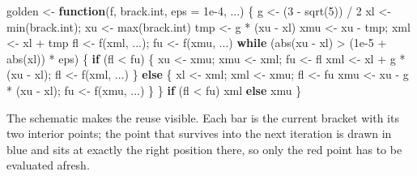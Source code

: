 \documentclass[
  letterpaper,
  DIV=11,
  numbers=noendperiod]{scrreprt}
\newenvironment{Shaded}{\begin{snugshade}}{\end{snugshade}}
\newcommand{\AttributeTok}[1]{\textcolor[rgb]{0.40,0.45,0.13}{#1}}
\newcommand{\ControlFlowTok}[1]{\textcolor[rgb]{0.00,0.23,0.31}{\textbf{#1}}}
\newcommand{\DecValTok}[1]{\textcolor[rgb]{0.68,0.00,0.00}{#1}}
\newcommand{\FloatTok}[1]{\textcolor[rgb]{0.68,0.00,0.00}{#1}}
\newcommand{\FunctionTok}[1]{\textcolor[rgb]{0.28,0.35,0.67}{#1}}
\newcommand{\NormalTok}[1]{\textcolor[rgb]{0.00,0.23,0.31}{#1}}
\newcommand{\OtherTok}[1]{\textcolor[rgb]{0.00,0.23,0.31}{#1}}
\newcommand{\SpecialCharTok}[1]{\textcolor[rgb]{0.37,0.37,0.37}{#1}}
\begin{document}
\begin{Shaded}
\begin{Highlighting}[]
\NormalTok{golden }\OtherTok{\textless{}{-}} \ControlFlowTok{function}\NormalTok{(f, brack.int, }\AttributeTok{eps =} \FloatTok{1e{-}4}\NormalTok{, ...) \{}
\NormalTok{  g }\OtherTok{\textless{}{-}}\NormalTok{ (}\DecValTok{3} \SpecialCharTok{{-}} \FunctionTok{sqrt}\NormalTok{(}\DecValTok{5}\NormalTok{)) }\SpecialCharTok{/} \DecValTok{2}
\NormalTok{  xl }\OtherTok{\textless{}{-}} \FunctionTok{min}\NormalTok{(brack.int); xu }\OtherTok{\textless{}{-}} \FunctionTok{max}\NormalTok{(brack.int)}
\NormalTok{  tmp }\OtherTok{\textless{}{-}}\NormalTok{ g }\SpecialCharTok{*}\NormalTok{ (xu }\SpecialCharTok{{-}}\NormalTok{ xl)}
\NormalTok{  xmu }\OtherTok{\textless{}{-}}\NormalTok{ xu }\SpecialCharTok{{-}}\NormalTok{ tmp; xml }\OtherTok{\textless{}{-}}\NormalTok{ xl }\SpecialCharTok{+}\NormalTok{ tmp}
\NormalTok{  fl }\OtherTok{\textless{}{-}} \FunctionTok{f}\NormalTok{(xml, ...); fu }\OtherTok{\textless{}{-}} \FunctionTok{f}\NormalTok{(xmu, ...)}
  \ControlFlowTok{while}\NormalTok{ (}\FunctionTok{abs}\NormalTok{(xu }\SpecialCharTok{{-}}\NormalTok{ xl) }\SpecialCharTok{\textgreater{}}\NormalTok{ (}\FloatTok{1e{-}5} \SpecialCharTok{+} \FunctionTok{abs}\NormalTok{(xl)) }\SpecialCharTok{*}\NormalTok{ eps) \{}
    \ControlFlowTok{if}\NormalTok{ (fl }\SpecialCharTok{\textless{}}\NormalTok{ fu) \{}
\NormalTok{      xu }\OtherTok{\textless{}{-}}\NormalTok{ xmu; xmu }\OtherTok{\textless{}{-}}\NormalTok{ xml; fu }\OtherTok{\textless{}{-}}\NormalTok{ fl}
\NormalTok{      xml }\OtherTok{\textless{}{-}}\NormalTok{ xl }\SpecialCharTok{+}\NormalTok{ g }\SpecialCharTok{*}\NormalTok{ (xu }\SpecialCharTok{{-}}\NormalTok{ xl); fl }\OtherTok{\textless{}{-}} \FunctionTok{f}\NormalTok{(xml, ...)}
\NormalTok{    \} }\ControlFlowTok{else}\NormalTok{ \{}
\NormalTok{      xl }\OtherTok{\textless{}{-}}\NormalTok{ xml; xml }\OtherTok{\textless{}{-}}\NormalTok{ xmu; fl }\OtherTok{\textless{}{-}}\NormalTok{ fu}
\NormalTok{      xmu }\OtherTok{\textless{}{-}}\NormalTok{ xu }\SpecialCharTok{{-}}\NormalTok{ g }\SpecialCharTok{*}\NormalTok{ (xu }\SpecialCharTok{{-}}\NormalTok{ xl); fu }\OtherTok{\textless{}{-}} \FunctionTok{f}\NormalTok{(xmu, ...)}
\NormalTok{    \}}
\NormalTok{  \}}
  \ControlFlowTok{if}\NormalTok{ (fl }\SpecialCharTok{\textless{}}\NormalTok{ fu) xml }\ControlFlowTok{else}\NormalTok{ xmu}
\NormalTok{\}}
\end{Highlighting}
\end{Shaded}

The schematic makes the reuse visible. Each bar is the current bracket
with its two interior points; the point that survives into the next
iteration is drawn in blue and sits at exactly the right position there,
so only the red point has to be evaluated afresh.
\end{document}
